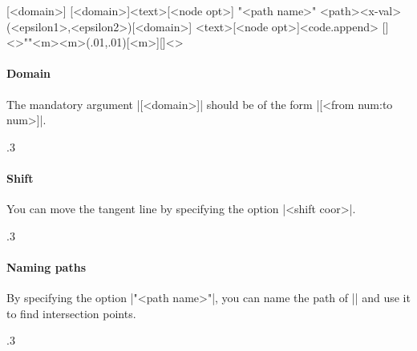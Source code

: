 \begin{tzdef}{}
[<domain>]
[<domain>]{<text>}[<node opt>]
"<path name>"
            {<path>}{<x-val>}(<epsilon1>,<epsilon2>)[<domain>]
            {<text>}[<node opt>]<code.append>
  []<>""{<m>}{<m>}(.01,.01)[<m>]{}[]<>
\end{tzdef}


\paragraph{Domain}
The mandatory argument |[<domain>]| should be of the form |[<from num:to num>]|.

\begin{tzcode}{.3}
{}
\end{tzcode}


\paragraph{Shift}
You can move the tangent line by specifying the option |<shift coor>|.

\begin{tzcode}{.3}
\end{tzcode}

\paragraph{Naming paths}
By specifying the option |"<path name>"|, you can name the path of |\tztangentat| and use it to find intersection points.

\begin{tzcode}{.3}
\end{tzcode}

